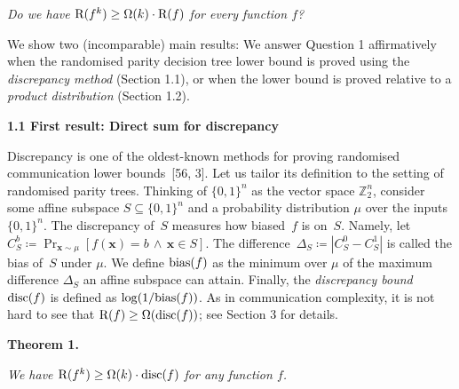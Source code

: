 \documentclass[10pt,a4paper]{article}
\begin{document}
\emph{Do we have ${\textup{R}}(f^{k})\geq\Omega(k)\cdot{\textup{R}}(f)$ for every function $f$?}\par






We show two (incomparable) main results: We answer Question 1 affirmatively when the randomised parity decision tree lower bound is proved using the \emph{discrepancy method} (Section 1.1), or when the lower bound is proved relative to a \emph{product distribution} (Section 1.2).\par





\par\medskip\noindent\textbf{
1.1 First result: Direct sum for discrepancy}\par




Discrepancy is one of the oldest-known methods for proving randomised communication lower bounds [56, 3]. Let us tailor its definition to the setting of randomised parity trees. Thinking of $\{0,1\}^{n}$ as the vector space $\mathbb{Z}_{2}^{n}$, consider some affine subspace $S\subseteq\{0,1\}^{n}$ and a probability distribution $\mu$ over the inputs $\{0,1\}^{n}$. The discrepancy of $S$ measures how biased $f$ is on $S$. Namely, let $C^{b}_{S}\coloneqq\Pr_{\bm{x}\sim\mu}[f(\bm{x})=b\,\wedge\,\bm{x}\in S]$. The difference $\Delta_{S}\coloneqq|C^{0}_{S}-C^{1}_{S}|$ is called the bias of $S$ under $\mu$. We define ${\textup{bias}}(f)$ as the minimum over $\mu$ of the maximum difference $\Delta_{S}$ an affine subspace can attain. Finally, the \emph{discrepancy bound} ${\textup{disc}}(f)$ is defined as $\log(1/{\textup{bias}}(f))$. As in communication complexity, it is not hard to see that ${\textup{R}}(f)\geq\Omega({\textup{disc}}(f))$; see Section 3 for details.\par





\par\medskip\noindent\textbf{
\textbf{Theorem 1}\textbf{.}
}\par



\emph{We have ${\textup{R}}(f^{k})\geq\Omega(k)\cdot{\textup{disc}}(f)$ for any function $f$.}\par
\end{document}
